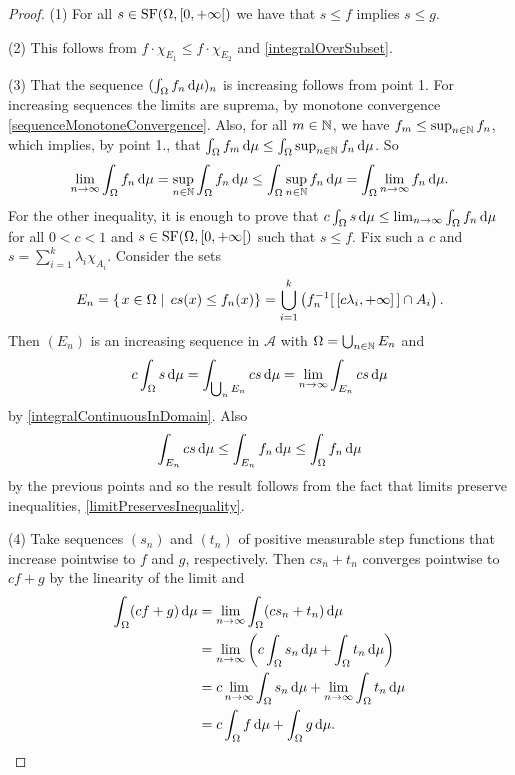 \begin{proof}
(1) For all $s\in \operatorname{SF}(\Omega, [0,+\infty[)$ we have that $s\leq f$ implies $s\leq g$.

(2) This follows from $f\cdot\chi_{E_1}\leq f\cdot\chi_{E_2}$ and \ref{integralOverSubset}.

(3) That the sequence $(\int_\Omega f_n\operatorname{d \!}{\mu})_n$ is increasing follows from point 1. For increasing sequences the limits are suprema, by monotone convergence \ref{sequenceMonotoneConvergence}. Also, for all $m\in\mathbb{N}$, we have $f_m\leq\sup_{n\in\mathbb{N}}f_n$, which implies, by point 1., that $\int_\Omega f_m\operatorname{d \!}{\mu}\leq \int_\Omega \sup_{n\in\mathbb{N}}f_n\operatorname{d \!}{\mu}$. So
\[ \lim_{n\to\infty}\int_\Omega f_n\operatorname{d \!}{\mu} = \sup_{n\in\mathbb{N}}\int_\Omega f_n\operatorname{d \!}{\mu} \leq \int_\Omega \sup_{n\in\mathbb{N}}f_n\operatorname{d \!}{\mu} = \int_\Omega \lim_{n\to\infty}f_n\operatorname{d \!}{\mu}. \]
For the other inequality, it is enough to prove that $c\int_\Omega s\operatorname{d \!}{\mu} \leq \lim_{n\to\infty}\int_\Omega f_n\operatorname{d \!}{\mu}$ for all $0<c<1$ and $s\in\operatorname{SF}(\Omega,[0,+\infty[)$ such that $s\leq f$. Fix such a $c$ and $s = \sum_{i=1}^k\lambda_i\chi_{A_i}$. Consider the sets
\[ E_n = \left\{\left. x\in\Omega \;\right|\; cs(x)\leq f_n(x) \right\} = \bigcup_{i=1}^k \left(f^{-1}_n[\,[c\lambda_i, +\infty]\,]\cap A_i\right). \]
Then $(E_n)$ is an increasing sequence in $\mathcal{A}$ with $\Omega= \bigcup_{n\in\mathbb{N}}E_n$ and
\[ c\int_\Omega s\operatorname{d \!}{\mu} = \int_{\bigcup_n E_n} cs\operatorname{d \!}{\mu} = \lim_{n\to\infty}\int_{E_n} cs\operatorname{d \!}{\mu} \]
by \ref{integralContinuousInDomain}. Also 
\[ \int_{E_n} cs\operatorname{d \!}{\mu} \leq \int_{E_n} f_n\operatorname{d \!}{\mu} \leq \int_{\Omega} f_n\operatorname{d \!}{\mu} \]
by the previous points and so the result follows from the fact that limits preserve inequalities, \ref{limitPreservesInequality}.

(4) Take sequences $(s_n)$ and $(t_n)$ of positive measurable step functions
that increase pointwise to $f$ and $g$, respectively. Then $cs_n+t_n$ converges pointwise to $cf+g$ by the linearity of the limit and
\begin{align*}
\int_\Omega(cf+g)\diff{\mu} &= \lim_{n\to\infty}\int_\Omega(cs_n+t_n)\diff{\mu} \\
&= \lim_{n\to\infty}\left(c\int_\Omega s_n\diff{\mu}+\int_\Omega t_n\diff{\mu}\right) \\
&= c\lim_{n\to\infty}\int_\Omega s_n\diff{\mu}+\lim_{n\to\infty}\int_\Omega t_n\diff{\mu} \\
&= c\int_\Omega f\diff{\mu} + \int_\Omega g\diff{\mu}.
\end{align*}
\end{proof}

